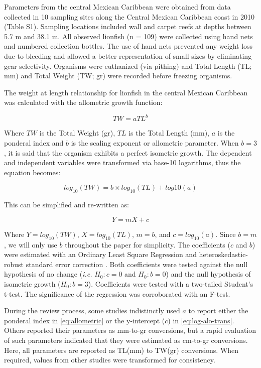 \documentclass[fleqn,10pt,lineno]{wlpeerj} %
\theoremstyle{definition}
\theoremstyle{definition}
\theoremstyle{definition}
\theoremstyle{remark}
\begin{document}
Parameters from the central Mexican Caribbean were obtained from data
collected in 10 sampling sites along the Central Mexican Caribbean coast
in 2010 (Table S1). Sampling locations included wall and carpet reefs at
depths between 5.7 m and 38.1 m. All observed lionfish (n = 109) were
collected using hand nets and numbered collection bottles. The use of
hand nets prevented any weight loss due to bleeding and allowed a better
representation of small sizes by eliminating gear selectivity. Organisms
were euthanized (via pithing) and Total Length (TL; mm) and Total Weight
(TW; gr) were recorded before freezing organisms.

The weight at length relationship for lionfish in the central Mexican
Caribbean was calculated with the allometric growth function:

\begin{equation}
\label{eq:allometric}
TW = aTL^b
\end{equation}

Where \(TW\) is the Total Weight (gr), \(TL\) is the Total Length (mm),
\(a\) is the ponderal index and \(b\) is the scaling exponent or
allometric parameter. When \(b = 3\), it is said that the organism
exhibits a perfect isometric growth. The dependent and independent
variables were transformed via base-10 logarithms, thus the equation
becomes:

\begin{equation}
\label{eq:log-alo}
log_{10}(TW) = b\times log_{10}(TL) + log{10}(a)
\end{equation}

This can be simplified and re-written as:

\begin{equation}
\label{eq:log-alo-trans}
Y = mX + c
\end{equation}

Where \(Y = log_{10}(TW)\), \(X = log_{10}(TL)\), \(m = b\), and
\(c = log_{10}(a)\). Since \(b = m\), we will only use \(b\) throughout
the paper for simplicity. The coefficients (\(c\) and \(b\)) were
estimated with an Ordinary Least Square Regression and
heteroskedastic-robust standard error correction \citep{zeileis_2004}.
Both coefficients were tested against the null hypothesis of no change
(\emph{i.e.} \(H_0: c = 0\) and \(H_0: b = 0\)) and the null hypothesis
of isometric growth (\(H_0: b = 3\)). Coefficients were tested with a
two-tailed Student's t-test. The significance of the regression was
corroborated with an F-test.

During the review process, some studies indistinctly used \(a\) to
report either the ponderal index in \ref{eq:allometric} or the
y-intercept (\(c\)) in \ref{eq:log-alo-trans}. Others reported their
parameters as mm-to-gr conversions, but a rapid evaluation of such
parameters indicated that they were estimated as cm-to-gr conversions.
Here, all parameters are reported as TL(mm) to TW(gr) conversions. When
required, values from other studies were transformed for consistency.
\end{document}
